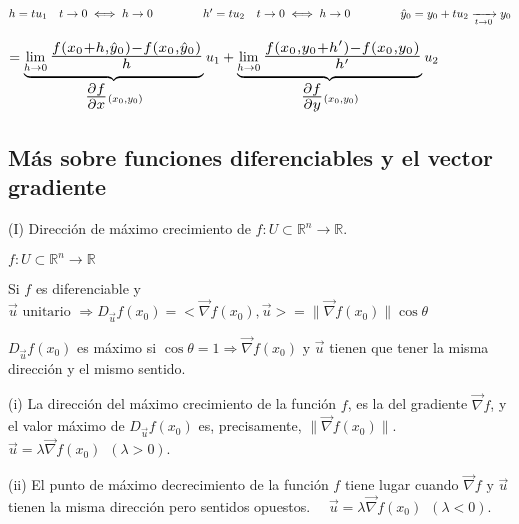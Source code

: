 \documentclass[10pt, titlepage]{article}
\newcommand{\R}{\mathbb{R}}
\newcommand{\bfrac}[2]{\scalebox{1.4}{$\frac{#1}{#2}$}}
\newcommand{\spac}{\, \, \,}
\begin{document}
$h =tu_1 \quad t \to 0 \iff h \to 0 \hspace{1.5cm} h' = tu_2 \quad t \to 0 \iff h \to 0 \hspace{1.5cm} 
\hat{y}_0 = y_0 + tu_2 \xrightarrow[t \to 0]{} y_0$
\vspace{3mm}

$=\displaystyle \underbrace{\lim_{h \to 0} \bfrac{f (x_0 + h, \hat{y}_0) - f (x_0, \hat{y}_0)}{h}} 
_{\bfrac{\partial f}{\partial x} (x_0, y_0)} u_1 + \underbrace{\lim_{h \to 0} \bfrac{f (x_0, y_0 + h') - 
f (x_0, y_0)}{h'}}_{\bfrac{\partial f}{\partial y} (x_0, y_0)} u_2$
\vspace{7mm}


\subsection{Más sobre funciones diferenciables y el vector gradiente}
\vspace{5mm}


(I) Dirección de máximo crecimiento de $f : U \subset \R^n \to \R$.
\vspace{3mm}

$f : U \subset \R^n \to \R$
\vspace{3mm}

Si $f$ es diferenciable y $\vec{u} \text{ unitario } \Rightarrow D_{\vec{u}} f (x_0) = < \vec{\nabla} f (x_0) 
, \vec{u} > = \|\vec{\nabla} f (x_0)\| \cos \theta$
\vspace{3mm}

$D_{\vec{u}} f (x_0)$ es máximo si $\cos \theta = 1 \Rightarrow \vec{\nabla} f (x_0) \text{ y } \vec{u}$ 
tienen que tener la misma dirección y el mismo sentido.
\vspace{3mm}

(i) La dirección del máximo crecimiento de la función $f$, es la del gradiente $\vec{\nabla} f$, y el valor máximo de \indent $D_{\vec{u}} f (x_0)$ es, precisamente, $\|\vec{\nabla} f (x_0)\|$. \quad $\vec{u} = 
\lambda \vec{\nabla} f (x_0) \spac (\lambda > 0)$.
\vspace{3mm}

(ii) El punto de máximo decrecimiento de la función $f$ tiene lugar cuando $\vec{\nabla} f \text{ y } \vec{u}
$ tienen la misma \indent dirección pero sentidos opuestos. $\quad \vec{u} = \lambda \vec{\nabla} f (x_0) 
\spac (\lambda < 0)$.
\vspace{3mm}
\end{document}
